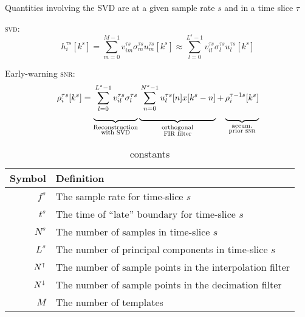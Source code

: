 \documentclass[letterpaper,11pt]{article}
\begin{document}
Quantities involving the SVD are at a given sample rate $s$ and in a time slice
$\tau$

\textsc{svd}:
\begin{equation}
h^{\tau s}_{i}\!\left[k^{s}\right] = \sum_{m=0}^{M-1} v^{\tau s}_{im} \sigma^{\tau s}_m u^{\tau s}_{m}[k^{s}] \approx \sum_{l=0}^{L^s-1} v^{\tau s}_{il} \sigma^{\tau s}_l u^{\tau s}_{l}[k^{s}]
\end{equation}

Early-warning \textsc{snr}:
\newcommand{\mystrut}{\rule[-2em]{0pt}{0pt}}  %
\begin{equation}
    \rho^{\tau s}_i[k^{s}] = \underbrace{\mystrut\sum_{l=0}^{L^{s}-1} v^{\tau s}_{il} \sigma^{\tau s}_l}_{\substack{\text{Reconstruction}\\ \text{with {\sc SVD}}}}
    \underbrace{\mystrut\sum_{n=0}^{N^{s} - 1} u^{\tau s}_{l}[n] x[k^{s}-n]}_{\substack{\text{orthogonal}\\ \text{{\sc FIR} filter}}} + 
    \underbrace{\mystrut\rho^{\tau - 1 s}_i[k^{s}]}_{\substack{\text{accum.}\\ \text{prior {\sc snr}}}}
\end{equation}

\begin{table}
\begin{tabular}{rl}
\hline
\textbf{Symbol} & \textbf{Definition} \\\hline
$f^{s}$ & The sample rate for time-slice $s$\\
$t^{s}$ & The time of ``late'' boundary for time-slice $s$\\
$N^{s}$ & The number of samples in time-slice $s$\\
$L^{s}$ & The number of principal components in time-slice $s$\\
$N^\shortuparrow$ & The number of sample points in the interpolation filter\\
$N^\shortdownarrow$ & The number of sample points in the decimation filter\\
$M$ & The number of templates\\
\hline
\end{tabular}
\caption{constants}
\end{table}
\end{document}
